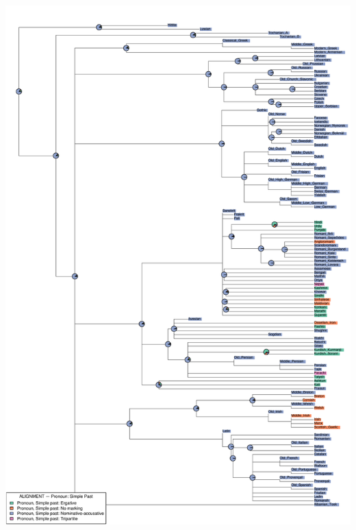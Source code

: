 \includegraphics[width=.9\linewidth]{supp-graphics/ALIGNMENTPronounSimplePastPPSTOSoALIGNMENTPronounSimplePastPPSTAOALIGNMENTPronounSimplePastPPSTASaALIGNMENTPronounSimplePastPPSTSaSo.pdf}

